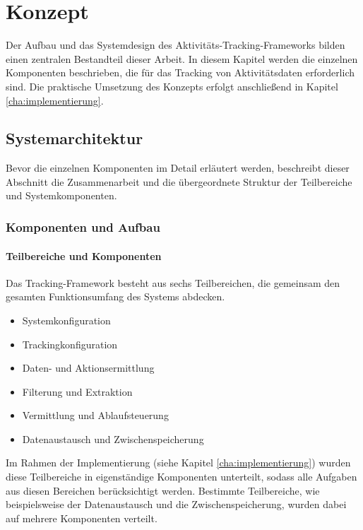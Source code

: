 \chapter{Konzept}
\label{cha:konzept}
Der Aufbau und das Systemdesign des Aktivitäts-Tracking-Frameworks bilden einen zentralen Bestandteil dieser Arbeit. In diesem Kapitel werden die einzelnen Komponenten beschrieben, die für das Tracking von Aktivitätsdaten erforderlich sind. Die praktische Umsetzung des Konzepts erfolgt anschließend in Kapitel \ref{cha:implementierung}.

\section{Systemarchitektur}
Bevor die einzelnen Komponenten im Detail erläutert werden, beschreibt dieser Abschnitt die Zusammenarbeit und die übergeordnete Struktur der Teilbereiche und Systemkomponenten.

\subsection{Komponenten und Aufbau}

\subsubsection{Teilbereiche und Komponenten}
\label{sec:system_design}
Das Tracking-Framework besteht aus sechs Teilbereichen, die gemeinsam den gesamten Funktionsumfang des Systems abdecken.

\begin{itemize}
    \item Systemkonfiguration
    \item Trackingkonfiguration
    \item Daten- und Aktionsermittlung
    \item Filterung und Extraktion
    \item Vermittlung und Ablaufsteuerung
    \item Datenaustausch und Zwischenspeicherung
\end{itemize}

Im Rahmen der Implementierung (siehe Kapitel \ref{cha:implementierung}) wurden diese Teilbereiche in eigenständige Komponenten unterteilt, sodass alle Aufgaben aus diesen Bereichen berücksichtigt werden. Bestimmte Teilbereiche, wie beispielsweise der Datenaustausch und die Zwischenspeicherung, wurden dabei auf mehrere Komponenten verteilt.

